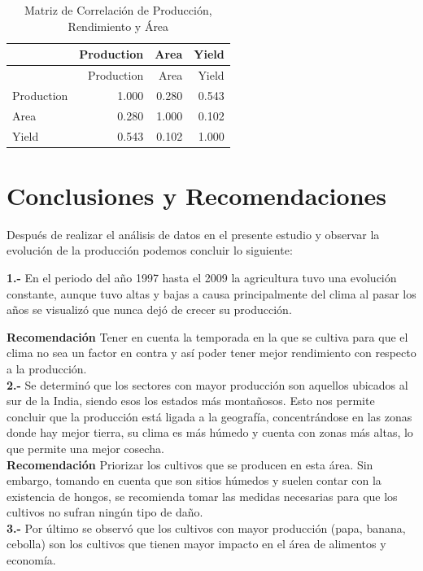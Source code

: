 \documentclass[oneside,11pt]{Latex/Classes/PhDthesisPSnPDF}
\begin{document}
\begin{longtable}[]{@{}lrrr@{}}
\caption{Matriz de Correlación de Producción, Rendimiento y
Área}\tabularnewline
\toprule\noalign{}
& Production & Area & Yield \\
\midrule\noalign{}
\endfirsthead
\toprule\noalign{}
& Production & Area & Yield \\
\midrule\noalign{}
\endhead
\bottomrule\noalign{}
\endlastfoot
Production & 1.000 & 0.280 & 0.543 \\
Area & 0.280 & 1.000 & 0.102 \\
Yield & 0.543 & 0.102 & 1.000 \\
\end{longtable}

\chapter{Conclusiones y Recomendaciones}

Después de realizar el análisis de datos en el presente estudio y
observar la evolución de la producción podemos concluir lo siguiente:

\textbf{1.-} En el periodo del año 1997 hasta el 2009 la agricultura
tuvo una evolución constante, aunque tuvo altas y bajas a causa
principalmente del clima al pasar los años se visualizó que nunca dejó
de crecer su producción.~

\textbf{Recomendación} Tener en cuenta la temporada en la que se cultiva
para que el clima no sea un factor en contra y así poder tener mejor
rendimiento con respecto a la producción.\\

\textbf{2.-} Se determinó que los sectores con mayor producción son
aquellos ubicados al sur de la India, siendo esos los estados más
montañosos. Esto nos permite concluir que la producción está ligada a la
geografía, concentrándose en las zonas donde hay mejor tierra, su clima
es más húmedo y cuenta con zonas más altas, lo que permite una mejor
cosecha.\\

\textbf{Recomendación} Priorizar los cultivos que se producen en esta
área. Sin embargo, tomando en cuenta que son sitios húmedos y suelen
contar con la existencia de hongos, se recomienda tomar las medidas
necesarias para que los cultivos no sufran ningún tipo de daño.\\

\textbf{3.-} Por último se observó que los cultivos con mayor producción
(papa, banana, cebolla) son los cultivos que tienen mayor impacto en el
área de alimentos y economía.\\
\end{document}
